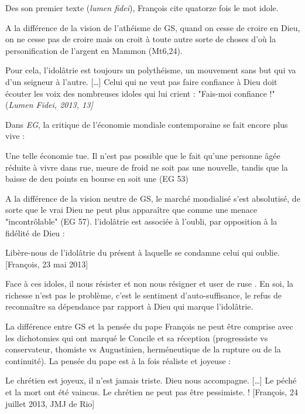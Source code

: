 Des son premier texte (\textit{lumen fidei}), François cite quatorze fois le mot idole. 

A la différence de la vision de l'athéisme de GS, quand on cesse de croire en Dieu, on ne cesse pas de croire mais on croit à toute autre sorte de choses d'où la personification de l'argent en Mammon (Mt6,24).
\begin{singlequote}
    Pour cela, l'idolâtrie est toujours un polythéisme, un mouvement sans but qui va d'un seigneur à l'autre. [\ldots] Celui qui ne veut pas faire confiance à Dieu doit écouter les voix des nombreuses idoles qui lui crient : "Fais-moi confiance !" (\textit{Lumen Fidei, 2013, 13]}
\end{singlequote}

Dans \textit{EG}, la critique de l'économie mondiale contemporaine se fait encore plus vive :  
\begin{singlequote}
    Une telle économie tue. Il n'est pas possible que le fait qu'une personne âgée réduite à vivre dans rue, meure de froid ne soit pas une nouvelle, tandis que la baisse de deu points en bourse en soit une (EG 53)
\end{singlequote}

A la différence de la vision neutre de GS, le marché mondialisé s'est absolutisé, de sorte que le vrai Dieu ne peut plus apparaître que comme une menace "incontrôlable" (EG 57).
l'idolâtrie est associée à l'oubli, par opposition à la fidélité de Dieu : 
\begin{singlequote}
    Libère-nous de l'idolâtrie du présent à laquelle se condamne celui qui oublie. [François, 23 mai 2013]
\end{singlequote}
Face à ces idoles, il nous résister et non nous résigner et user de ruse \cite[p. 138]{cavanaugh_idolatrie_2022}. 
En soi, la richesse n'est pas le problème, c'est le sentiment d'auto-suffisance, le refus de reconnaître sa dépendance par rapport à Dieu qui marque l'idolâtrie.


La différence entre GS et la pensée du pape François ne peut être comprise avec les dichotomies qui ont marqué le Concile et sa réception (progressiste vs conservateur, thomiste vs Augustinien, herméneutique de la rupture ou de la continuité). 
La pensée du pape est à la fois réaliste et joyeuse : 
\begin{singlequote}
    Le chrétien est joyeux, il n'est jamais triste. Dieu nous accompagne. [\ldots] Le péché et la mort ont été vaincus. Le chrétien ne peut pas être pessimiste. ! [François, 24 juillet 2013, JMJ de Rio]
\end{singlequote}

